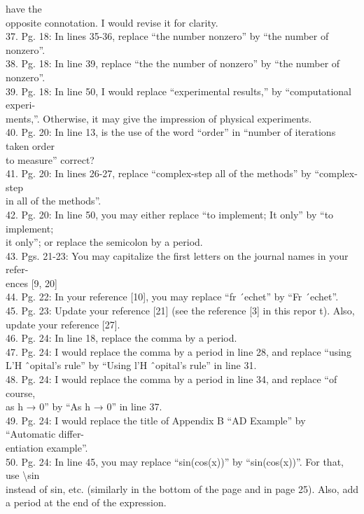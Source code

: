 have the \\opposite connotation. I would revise it for clarity. \\37.
Pg. 18: In lines 35-36, replace ``the number nonzero'' by ``the number
of nonzero''. \\38. Pg. 18: In line 39, replace ``the the number of
nonzero'' by ``the number of nonzero''. \\39. Pg. 18: In line 50, I
would replace ``experimental results,'' by ``computational experi-
\\ments,''. Otherwise, it may give the impression of physical
experiments. \\40. Pg. 20: In line 13, is the use of the word ``order''
in ``number of iterations taken order \\to measure'' correct? \\41. Pg.
20: In lines 26-27, replace ``complex-step all of the methods'' by
``complex-step \\in all of the methods''. \\42. Pg. 20: In line 50, you
may either replace ``to implement; It only'' by ``to implement; \\it
only''; or replace the semicolon by a period. \\43. Pgs. 21-23: You may
capitalize the ﬁrst letters on the journal names in your refer- \\ences
{[}9, 20{]} \\44. Pg. 22: In your reference {[}10{]}, you may replace
``fr ´echet'' by ``Fr ´echet''. \\45. Pg. 23: Update your reference
{[}21{]} (see the reference {[}3{]} in this repor t). Also, \\update
your reference {[}27{]}. \\46. Pg. 24: In line 18, replace the comma by
a period. \\47. Pg. 24: I would replace the comma by a period in line
28, and replace ``using \\L'H ˆopital's rule'' by ``Using l'H ˆopital's
rule'' in line 31. \\48. Pg. 24: I would replace the comma by a period
in line 34, and replace ``of course, \\as h → 0'' by ``As h → 0'' in
line 37. \\49. Pg. 24: I would replace the title of Appendix B ``AD
Example'' by ``Automatic differ- \\entiation example''. \\50. Pg. 24: In
line 45, you may replace ``sin(cos(x))'' by ``sin(cos(x))''. For that,
use \textbackslash{}sin \\instead of sin, etc. (similarly in the bottom
of the page and in page 25). Also, add \\a period at the end of the
expression. \\

